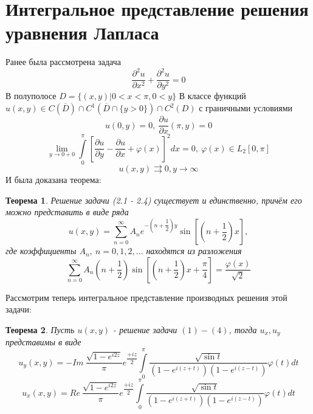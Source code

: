 \documentclass[12pt, a4paper]{extarticle}
\newtheorem{theorem}{Теорема}
\numberwithin{equation}{section}
\numberwithin{lemma}{section}
\numberwithin{definition}{section}
\numberwithin{notabene}{section}
\numberwithin{corollary}{section}
\begin{document}
	\section*{Интегральное представление решения уравнения Лапласа}
	Ранее была рассмотрена задача
	\begin{equation}
		\dfrac{\partial^2 u}{\partial x^2} +\dfrac{\partial^2 u}{\partial y^2} = 0
	\end{equation}
	В полуполосе $D = \{(x,y) \vert 0 < x < \pi, 0 < y\}$\newline
	В классе функций $u(x,y) \in C(\overline{D}) \cap C^1(\overline{D} \cap \{y > 0\}) \cap C^2 (D)$ \newline
	с граничными условиями
	\begin{equation}
		u(0, y) = 0, \ \dfrac{\partial u}{\partial x} (\pi, y) = 0
	\end{equation}
	\begin{equation}
		\lim\limits_{y \to 0 + 0} \int\limits_0^\pi \left[\dfrac{\partial u}{\partial y} - \dfrac{\partial u}{\partial x} + \varphi(x) \right]^2 dx = 0, \ \varphi(x) \in L_2[0,\pi]
	\end{equation}
	\begin{equation}
		u(x,y) \rightrightarrows 0, y \to \infty
	\end{equation}
	И была доказана теорема:
	\begin{theorem}
		Решение задачи (2.1 - 2.4) существует и единственно, причём его можно представить в виде ряда
		\begin{equation}
			u(x,y) = \sum\limits_{n=0}^{\infty} A_n e^{-\left(n + \dfrac12\right)y} \sin{\left[\left(n + \dfrac12\right)x\right]},
		\end{equation}
		где коэффициенты $A_n, \ n =0,1,2, \dots$ находятся из разложения
		\begin{equation}
			\sum\limits_{n=0}^{\infty} A_n \left(n + \dfrac12 \right) \sin{\left[\left(n +\dfrac12\right)x + \dfrac\pi4\right]} = \dfrac{\varphi(x)}{\sqrt2}
		\end{equation}
	\end{theorem}
	\newpage
	Рассмотрим теперь интегральное представление производных решения этой задачи:
	\begin{theorem}
		Пусть $u(x,y)$ - решение задачи $(1)-(4)$, тогда $u_x, u_y$ представимы в виде
		\begin{equation}
				u_y(x,y) = - Im\  \dfrac{ \sqrt{1 - e^{i2z}} }{\pi} e^{\dfrac{+iz}{2}} \int\limits_0^\pi  \dfrac{\sqrt{\sin{t}}}{\left(1 - e^{i(z+t)} \right) \left(1 - e^{i(z-t)}\right)}  \varphi(t) dt
		\end{equation}
		\begin{equation}
			u_x(x,y) = Re\   \dfrac{ \sqrt{1 - e^{i2z}} }{\pi} e^{\dfrac{+iz}{2}} \int\limits_0^\pi  \dfrac{\sqrt{\sin{t}}}{\left(1 - e^{i(z+t)} \right) \left(1 - e^{i(z-t)}\right)}  \varphi(t) dt
		\end{equation}
	\end{theorem}
\end{document}
